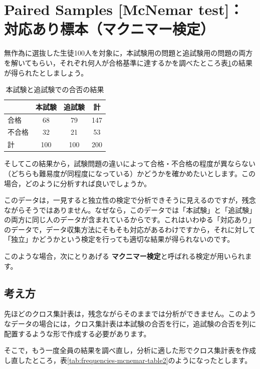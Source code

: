 \documentclass[
  12pt,
  a5jpaper,
  lualatex, ja=standard]{bxjsbook}
\renewcommand{\emph}[1]{\textbf{\color{emph} #1}}
\begin{document}
\hypertarget{sec:frequencies-mcnemar}{%
\section{Paired Samples {[}McNemar test{]}：対応あり標本（マクニマー検定）}\label{sec:frequencies-mcnemar}}

無作為に選抜した生徒100人を対象に，本試験用の問題と追試験用の問題の両方を解いてもらい，それぞれ何人が合格基準に達するかを調べたところ表\ref{tab:frequencies-mcnemar-table}の結果が得られたとしましょう。

\begin{table}[H]

\caption{\label{tab:frequencies-mcnemar-table}本試験と追試験での合否の結果}
\centering
\begin{tabular}[t]{lccc}
\toprule
  & 本試験 & 追試験 & 計\\
\midrule
合格 & 68 & 79 & 147\\
不合格 & 32 & 21 & 53\\
計 & 100 & 100 & 200\\
\bottomrule
\end{tabular}
\end{table}

そしてこの結果から，試験問題の違いによって合格・不合格の程度が異ならない（どちらも難易度が同程度になっている）かどうかを確かめたいとします。この場合，どのように分析すれば良いでしょうか。

このデータは，一見すると独立性の検定で分析できそうに見えるのですが，残念ながらそうではありません。なぜなら，このデータでは「本試験」と「追試験」の両方に同じ人のデータが含まれているからです。これはいわゆる「対応あり」のデータで，データ収集方法にそもそも対応があるわけですから，それに対して「独立」かどうかという検定を行っても適切な結果が得られないのです。

このような場合，次にとりあげる\emph{マクニマー検定}と呼ばれる検定が用いられます。

\hypertarget{sub:frequencies-mcnemar-basics}{%
\subsection{考え方}\label{sub:frequencies-mcnemar-basics}}

先ほどのクロス集計表は，残念ながらそのままでは分析ができません。このようなデータの場合には，クロス集計表は本試験の合否を行に，追試験の合否を列に配置するような形で作成する必要があります。

そこで，もう一度全員の結果を調べ直し，分析に適した形でクロス集計表を作成し直したところ，表\ref{tab:frequencies-mcnemar-table2}のようになったとします。
\end{document}

